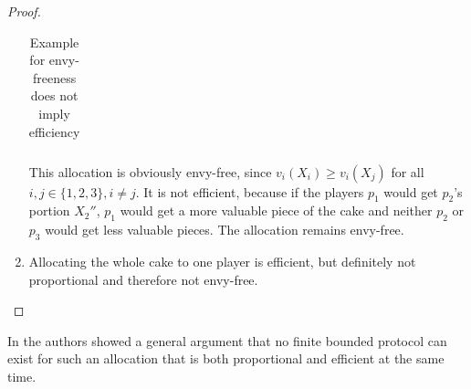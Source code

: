 \begin{proof}
\begin{enumerate}
\begin{table}[htb]
\begin{tabular}{c|ccc}
 		\end{tabular}	 
\caption{Example for envy-freeness does not imply efficiency}\label{Table3}
\end{table}
\newline This allocation is obviously envy-free, since $v_i(X_i) \geq v_i(X_j)$ for all $i, j \in \{1,2,3\}, i \neq j$. It is not efficient, because if the players $p_1$ would get $p_2$'s portion $X_2''$, $p_1$ would get a more valuable piece of the cake and neither $p_2$ or $p_3$ would get less valuable pieces. The allocation remains envy-free.
		\item Allocating the whole cake to one player is efficient, but definitely not proportional and therefore not envy-free.
	\end{enumerate}
\end{proof}
In \cite{brams2} the authors showed a general argument that no finite bounded protocol can exist for such an allocation that is both proportional and efficient at the same time.
